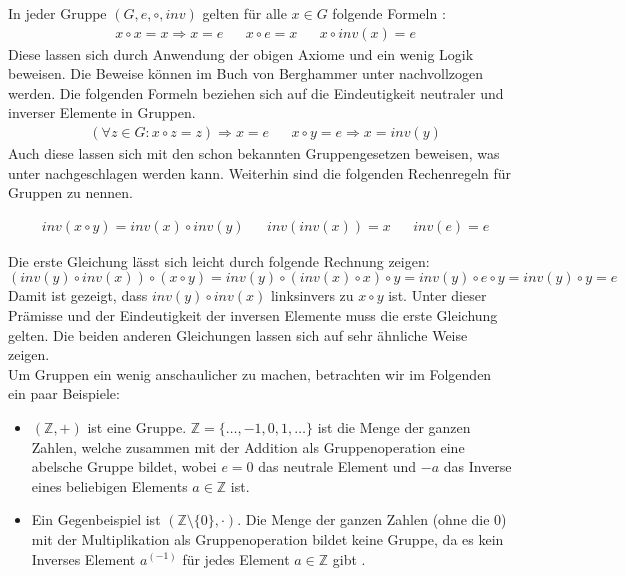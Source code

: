 In jeder Gruppe $(G,e,\circ,inv)$ gelten für alle $x \in G$ folgende Formeln \cite[S. 357-359]{Berghammer.2021}:
\begin{align*}
&x \circ x = x \Rightarrow x = e
&&x \circ e = x
&&x \circ inv(x) = e
\end{align*}
Diese lassen sich durch Anwendung der obigen Axiome und ein wenig Logik beweisen. Die Beweise können im Buch von Berghammer unter \cite[S. 358, 359]{Berghammer.2021} nachvollzogen werden. Die folgenden Formeln beziehen sich auf die Eindeutigkeit neutraler und inverser Elemente in Gruppen.
\begin{align*}
&(\forall z \in G: x \circ z = z) \Rightarrow x = e
&&x \circ y = e \Rightarrow x = inv(y)
\end{align*}
Auch diese lassen sich mit den schon bekannten Gruppengesetzen beweisen, was unter \cite[S. 358, 359]{Berghammer.2021} nachgeschlagen werden kann. Weiterhin sind die folgenden Rechenregeln für Gruppen zu nennen.

\begin{align*}
&inv(x \circ y) = inv(x) \circ inv(y)
&&inv(inv(x)) = x
&&inv(e) = e
\end{align*}

Die erste Gleichung lässt sich leicht durch folgende Rechnung zeigen:
$$(inv(y) \circ inv(x)) \circ (x \circ y) = inv(y) \circ (inv(x) \circ x) \circ y = inv(y) \circ e \circ y = inv(y) \circ y = e$$
Damit ist gezeigt, dass $inv(y) \circ inv(x)$ linksinvers zu $x \circ y$ ist. Unter dieser Prämisse und der Eindeutigkeit der inversen Elemente muss die erste Gleichung gelten. Die beiden anderen Gleichungen lassen sich auf sehr ähnliche Weise zeigen.\\

Um Gruppen ein wenig anschaulicher zu machen, betrachten wir im Folgenden ein paar Beispiele:
\begin{itemize}
\item $(\mathbb{Z}, +)$ ist eine Gruppe. $\mathbb{Z} = \{\dots, -1, 0, 1, \dots \}$ ist die Menge der ganzen Zahlen, welche zusammen mit der Addition als Gruppenoperation eine abelsche Gruppe bildet, wobei $e = 0$ das neutrale Element und $-a$ das Inverse eines beliebigen Elements $a \in \mathbb{Z}$ ist.
\item Ein Gegenbeispiel ist $(\mathbb{Z} \setminus \{0\}, \cdot)$. Die Menge der ganzen Zahlen (ohne die 0) mit der Multiplikation als Gruppenoperation bildet keine Gruppe, da es kein Inverses Element $a^(-1)$ für jedes Element $a \in \mathbb{Z}$ gibt \cite[S. 239, 240]{Paar.2016}.
\end{itemize}
